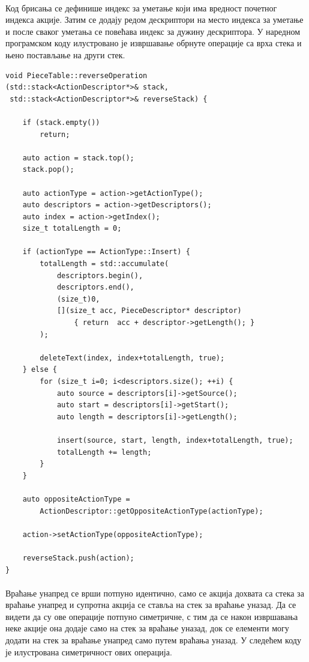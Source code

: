 \documentclass[12pt,oneside]{memoir}
\begin{document}
\paragraph{}
Код брисања се дефинише индекс за уметање који има вредност почетног индекса акције. Затим се додају редом дескриптори на место индекса за уметање и после сваког уметања се повећава индекс за дужину дескриптора. У наредном програмском
коду илустровано је извршавање обрнуте операције са врха стека и њено постављање
на други стек.

\begin{verbatim}
void PieceTable::reverseOperation
(std::stack<ActionDescriptor*>& stack, 
 std::stack<ActionDescriptor*>& reverseStack) {
	
	if (stack.empty())
		return;
	
	auto action = stack.top();
	stack.pop();
	
	auto actionType = action->getActionType();
	auto descriptors = action->getDescriptors();
	auto index = action->getIndex();
	size_t totalLength = 0;
	
	if (actionType == ActionType::Insert) {
		totalLength = std::accumulate(
			descriptors.begin(), 
			descriptors.end(), 
			(size_t)0,
			[](size_t acc, PieceDescriptor* descriptor) 
				{ return  acc + descriptor->getLength(); }
		);
		
		deleteText(index, index+totalLength, true);
	} else {
		for (size_t i=0; i<descriptors.size(); ++i) {
			auto source = descriptors[i]->getSource();
			auto start = descriptors[i]->getStart();
			auto length = descriptors[i]->getLength();
			
			insert(source, start, length, index+totalLength, true);
			totalLength += length;
		}
	}
	
	auto oppositeActionType = 
		ActionDescriptor::getOppositeActionType(actionType);
		
	action->setActionType(oppositeActionType);
	
	reverseStack.push(action);
}
\end{verbatim}

\paragraph{}
Враћање унапред се врши потпуно идентично, само се акција дохвата
са стека за враћање унапред и супротна акција се ставља на стек за враћање
уназад. Да се видети да су ове операције потпуно симетричне, с тим да се након 
извршавања неке акције она додаје само на стек за враћање уназад, док се елементи могу додати на стек за враћање унапред само путем враћања уназад. У следећем
коду је илустрована симетричност ових операција.
\end{document}
